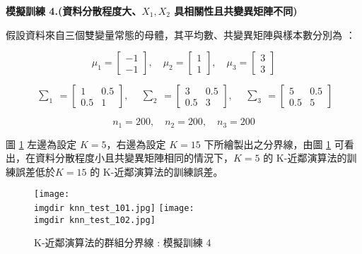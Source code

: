 \textbf{\large 模擬訓練 4.(資料分散程度大、$X_1, X_2$ 具相關性且共變異矩陣不同)}

假設資料來自三個雙變量常態的母體，其平均數、共變異矩陣與樣本數分別為 ：

\[\mu_1 = \begin{bmatrix}
-1 \\
-1
\end{bmatrix}, \quad \mu_2 = \begin{bmatrix}
1 \\
1
\end{bmatrix}, \quad \mu_3 = \begin{bmatrix}
3 \\
3
\end{bmatrix}\]

\[\begin{matrix} \sum_{1} \end{matrix} = \begin{bmatrix}
1 & 0.5\\
0.5 & 1
\end{bmatrix}, \quad \begin{matrix} \sum_{2} \end{matrix} = \begin{bmatrix}
3 & 0.5\\
0.5 & 3
\end{bmatrix}, \quad \begin{matrix} \sum_{3} \end{matrix} = \begin{bmatrix}
5 & 0.5\\
0.5 & 5
\end{bmatrix}\]

\[n_1 = 200, \quad n_2 = 200, \quad n_3 = 200\]

圖 \ref{fig:knn_test_10} 左邊為設定 $K =5$，右邊為設定 $K = 15$ 下所繪製出之分界線，由圖 \ref{fig:knn_test_10} 可看出，在資料分散程度小且共變異矩陣相同的情況下，$K = 5$ 的 K-近鄰演算法的訓練誤差低於$K = 15$ 的 K-近鄰演算法的訓練誤差。

\begin{figure}[H]
\centering
\texttt{[image: \\imgdir knn\_test\_101.jpg]}
\texttt{[image: \\imgdir knn\_test\_102.jpg]}
\caption{K-近鄰演算法的群組分界線 : 模擬訓練 4} 
\label{fig:knn_test_10}
\end{figure}

